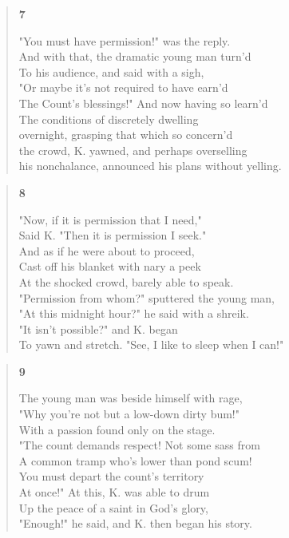 \documentclass{article}
\begin{document}
\begin{verse}
  \begin{center}
    \textbf{7} \\
  \end{center}
  "You must have permission!" was the reply. \\
  And with that, the dramatic young man turn'd \\
  To his audience, and said with a sigh, \\
  "Or maybe it's not required to have earn'd \\
  The Count's blessings!" And now having so learn'd \\
  The conditions of discretely dwelling \\
  overnight, grasping that which so concern'd \\
  the crowd, K. yawned, and perhaps overselling \\
  his nonchalance, announced his plans without yelling.
\end{verse}
\newpage
\begin{verse}
  \begin{center}
    \textbf{8} \\
  \end{center}
  "Now, if it is permission that I need," \\
  Said K. "Then it is permission I seek." \\
  And as if he were about to proceed, \\
  Cast off his blanket with nary a peek \\
  At the shocked crowd, barely able to speak. \\
  "Permission from whom?" sputtered the young man, \\
  "At this midnight hour?" he said with a shreik. \\
  "It isn't possible?" and K. began \\
  To yawn and stretch. "See, I like to sleep when I can!"
\end{verse}
\begin{verse}
  \begin{center}
    \textbf{9} \\
  \end{center}
  The young man was beside himself with rage, \\
  "Why you're not but a low-down dirty bum!" \\
  With a passion found only on the stage. \\
  "The count demands respect! Not some sass from \\
  A common tramp who's lower than pond scum! \\
  You must depart the count's territory \\
  At once!" At this, K. was able to drum \\
  Up the peace of a saint in God's glory, \\
  "Enough!" he said, and K. then began his story.
\end{verse}
\end{document}
